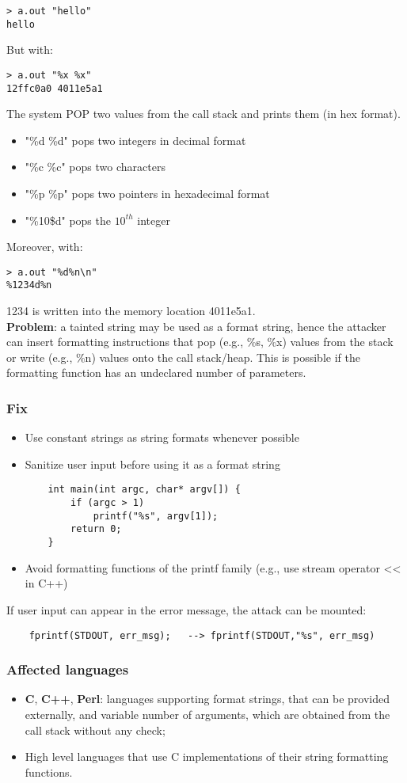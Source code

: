 \documentclass[a4paper, 10pt, titlepage]{article}
\begin{document}
\begin{verbatim}
> a.out "hello"
hello
\end{verbatim}
But with:
\begin{verbatim}
> a.out "%x %x"
12ffc0a0 4011e5a1
\end{verbatim}
The system POP two values from the call stack and prints them (in hex format).
\begin{itemize}
\item "\%d \%d" pops two integers in decimal format
\item "\%c \%c" pops two characters
\item "\%p \%p" pops two pointers in hexadecimal format
\item "\%10\$d" pops the $10^{th}$ integer
\end{itemize}
Moreover, with:
\begin{verbatim}
> a.out "%d%n\n"
%1234d%n
\end{verbatim}
1234 is written into the memory location 4011e5a1. \medskip\\
\textbf{Problem}: a tainted string may be used as a format string, hence the attacker can insert formatting instructions that pop (e.g., \%s, \%x) values from the stack or write (e.g., \%n) values onto the call stack/heap. This is possible if the formatting function has an undeclared number of parameters. 

\subsubsection*{Fix}
\begin{itemize}
\item Use constant strings as string formats whenever possible
\item Sanitize user input before using it as a format string
\begin{lstlisting}	
	int main(int argc, char* argv[]) {
		if (argc > 1)
			printf("%s", argv[1]);
		return 0;
	}
\end{lstlisting}
\item Avoid formatting functions of the printf family (e.g., use stream operator << in C++)
\end{itemize}
If user input can appear in the error message, the attack can be
mounted:
\begin{lstlisting}
	fprintf(STDOUT, err_msg);	-->	fprintf(STDOUT,"%s", err_msg)
\end{lstlisting}

\subsubsection*{Affected languages}
\begin{itemize}
\item \textbf{C}, \textbf{C++}, \textbf{Perl}: languages supporting format strings, that can be provided externally, and variable number of arguments, which are obtained from the call stack without any check;
\item High level languages that use C implementations of their string
formatting functions.
\end{itemize}
\newpage
\end{document}
